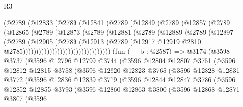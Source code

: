 \begin{lexlean}{R3}
\begin{coremodule}
                      (@2789
                        (@12833
                          (@2789
                            (@12841
                              (@2789
                                (@12849
                                  (@2789
                                    (@12857
                                      (@2789
                                        (@12865
                                          (@2789
                                            (@12873
                                              (@2789
                                                (@12881
                                                  (@2789
                                                    (@12889
                                                      (@2789
                                                        (@12897
                                                          (@2789
                                                            (@12905
                                                              (@2789
                                                                (@12913
                                                                  (@2789
                                                                    (@12917
                                                                      @12919
                                                                      @2810
                                                                      @2785)))))))))))))))))))))))))))))))))
    (fun (__b : @2587) =>
    @3174
      (@3598
        @3737
        (@3596
          @12796
          @12799
          @3744
          (@3596
            @12804
            @12807
            @3751
            (@3596
              @12812
              @12815
              @3758
              (@3596
                @12820
                @12823
                @3765
                (@3596
                  @12828
                  @12831
                  @3772
                  (@3596
                    @12836
                    @12839
                    @3779
                    (@3596
                      @12844
                      @12847
                      @3786
                      (@3596
                        @12852
                        @12855
                        @3793
                        (@3596
                          @12860
                          @12863
                          @3800
                          (@3596
                            @12868
                            @12871
                            @3807
                            (@3596

\end{coremodule}
\end{lexlean}

